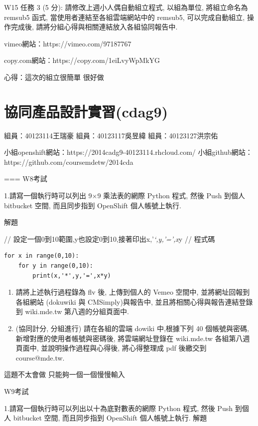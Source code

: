 \documentclass[]{article}
\begin{document}
W15 任務 3 (5 分): 請修改上週小人偶自動組立程式, 以組為單位,
將組立命名為 remsub5 函式, 當使用者連結至各組雲端網站中的 remsub5,
可以完成自動組立, 操作完成後, 請將分組心得與相關連結放入各組協同報告中.

vimeo網站：https://vimeo.com/97187767

copy.com網站：https://copy.com/1eiLvyWpMkYG

心得：這次的組立很簡單 很好做

\section{協同產品設計實習(cdag9)}\label{ux5354ux540cux7522ux54c1ux8a2dux8a08ux5be6ux7fd2cdag9}

組員：40123114王瑞豪 組員：40123117吳昱緯 組員：40123127洪宗佑

小組openshift網站：https://2014cadg9-40123114.rhcloud.com/
小組github網站：https://github.com/coursemdetw/2014cda

=== W8考試

1.請寫一個執行時可以列出 9×9 乘法表的網際 Python 程式, 然後 Push 到個人
bitbucket 空間, 而且同步指到 OpenShift 個人帳號上執行.

解題

// 設定一個0到10範圍,y也設定0到10,接著印出x,'\emph{`,y,'=',x}y // 程式碼

\begin{verbatim}
for x in range(0,10):
    for y in range(0,10):
        print(x,'*',y,'=',x*y)
\end{verbatim}

\begin{enumerate}
\def\labelenumi{\arabic{enumi}.}
\setcounter{enumi}{1}
\item
  請將上述執行過程錄為 flv 後, 上傳到個人的 Vemeo 空間中,
  並將網址回報到各組網站 (dokuwiki 與 CMSimply)與報告中,
  並且將相關心得與報告連結登錄到 wiki.mde.tw 第八週的分組頁面中.
\item
  (協同計分, 分組進行) 請在各組的雲端 dowiki 中,根據下列 40
  個帳號與密碼, 新增對應的使用者帳號與密碼後, 將雲端網址登錄在
  wiki.mde.tw 各組第八週頁面中, 並說明操作過程與心得後, 將心得整理成 pdf
  後繳交到 course@mde.tw.
\end{enumerate}

這題不太會做 只能夠一個一個慢慢輸入

W9考試

1.請寫一個執行時可以列出以十為底對數表的網際 Python 程式, 然後 Push
到個人 bitbucket 空間, 而且同步指到 OpenShift 個人帳號上執行. 解題
\end{document}
